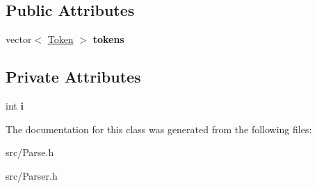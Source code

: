 \subsection*{Public Attributes}
\begin{DoxyCompactItemize}
\item 
\hypertarget{class_token_stream_aba584078d42eb429302e6cb4373d37a5}{vector$<$ \hyperlink{struct_token}{Token} $>$ {\bfseries tokens}}\label{class_token_stream_aba584078d42eb429302e6cb4373d37a5}

\end{DoxyCompactItemize}
\subsection*{Private Attributes}
\begin{DoxyCompactItemize}
\item 
\hypertarget{class_token_stream_aab11b13f9e91d978d181ef0f8c7b25d7}{int {\bfseries i}}\label{class_token_stream_aab11b13f9e91d978d181ef0f8c7b25d7}

\end{DoxyCompactItemize}


The documentation for this class was generated from the following files\-:\begin{DoxyCompactItemize}
\item 
src/Parse.\-h\item 
src/Parser.\-h\end{DoxyCompactItemize}

